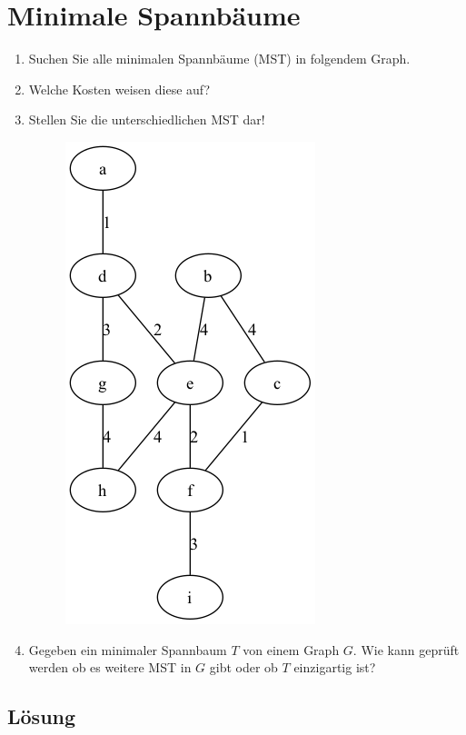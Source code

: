 \documentclass[a4paper,11pt]{report}
\begin{document}
    \chapter{Minimale Spannbäume}
    \label{ch:minSb}
    \begin{enumerate}
        \item Suchen Sie alle minimalen Spannbäume (MST) in folgendem Graph.
        \item Welche Kosten weisen diese auf?
        \item Stellen Sie die unterschiedlichen MST dar!

        \begin{figure}[H]
            \centering
            \includegraphics[height=0.3\textheight]{a03a_graph}
            \label{fig:a03_graph}
        \end{figure}

        \item Gegeben ein minimaler Spannbaum $T$ von einem Graph $G$. \hfill
        Wie kann geprüft werden ob es weitere MST in $G$ gibt oder ob $T$ einzigartig ist?
    \end{enumerate}

    \section{Lösung}
\end{document}
